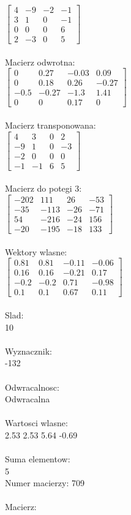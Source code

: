 \documentclass[a4paper,12pt]{article}
\begin{document}
$\begin{bmatrix} 4&-9&-2&-1\\3&1&0&-1\\0&0&0&6\\2&-3&0&5 \end{bmatrix}$
\\
\\
Macierz odwrotna:\\

$\begin{bmatrix} 0&0.27&-0.03&0.09\\0&0.18&0.26&-0.27\\-0.5&-0.27&-1.3&1.41\\0&0&0.17&0 \end{bmatrix}$
\\
\\
Macierz transponowana:\\

$\begin{bmatrix} 4&3&0&2\\-9&1&0&-3\\-2&0&0&0\\-1&-1&6&5 \end{bmatrix}$
\\
\\
Macierz do potegi 3:\\

$\begin{bmatrix} -202&111&26&-53\\-35&-113&-26&-71\\54&-216&-24&156\\-20&-195&-18&133 \end{bmatrix}$
\\
\\
Wektory wlasne:\\

$\begin{bmatrix} 0.81&0.81&-0.11&-0.06\\0.16&0.16&-0.21&0.17\\-0.2&-0.2&0.71&-0.98\\0.1&0.1&0.67&0.11 \end{bmatrix}$
\\
\\
Slad:\\
10
\\
\\
Wyznacznik:\\
-132
\\
\\
Odwracalnosc:\\
Odwracalna
\\
\\
Wartosci wlasne:\\
2.53 2.53 5.64 -0.69
\\
\\
Suma elementow:\\
5
\\
\newpage
Numer macierzy:
709
\\
\\
Macierz:\\
\end{document}
